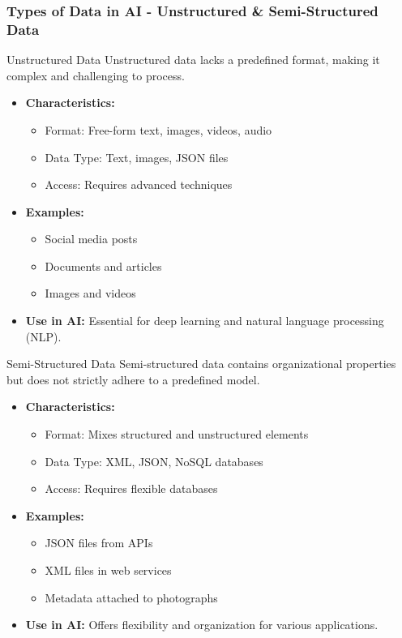 \documentclass[aspectratio=169]{beamer}
\begin{document}
\begin{frame}[fragile]
    \frametitle{Types of Data in AI - Unstructured & Semi-Structured Data}
    \begin{block}{Unstructured Data}
        Unstructured data lacks a predefined format, making it complex and challenging to process.
    \end{block}
    \begin{itemize}
        \item \textbf{Characteristics:}
        \begin{itemize}
            \item Format: Free-form text, images, videos, audio
            \item Data Type: Text, images, JSON files
            \item Access: Requires advanced techniques
        \end{itemize}
        \item \textbf{Examples:}
        \begin{itemize}
            \item Social media posts
            \item Documents and articles
            \item Images and videos
        \end{itemize}
        \item \textbf{Use in AI:} Essential for deep learning and natural language processing (NLP).
    \end{itemize}
    
    \begin{block}{Semi-Structured Data}
        Semi-structured data contains organizational properties but does not strictly adhere to a predefined model.
    \end{block}
    \begin{itemize}
        \item \textbf{Characteristics:}
        \begin{itemize}
            \item Format: Mixes structured and unstructured elements
            \item Data Type: XML, JSON, NoSQL databases
            \item Access: Requires flexible databases
        \end{itemize}
        \item \textbf{Examples:}
        \begin{itemize}
            \item JSON files from APIs
            \item XML files in web services
            \item Metadata attached to photographs
        \end{itemize}
        \item \textbf{Use in AI:} Offers flexibility and organization for various applications.
    \end{itemize}
\end{frame}
\end{document}
